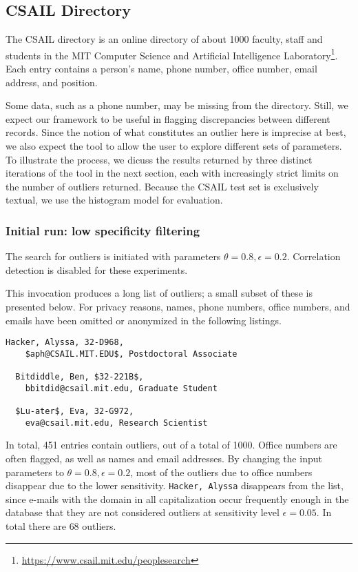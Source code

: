 \subsection{CSAIL Directory}
\label{sec:csail-directory-evaluation}

The CSAIL directory is an online directory of about 1000 faculty, staff and students in the MIT Computer Science and Artificial Intelligence Laboratory\footnote{\url{https://www.csail.mit.edu/peoplesearch}}. Each entry contains a person's name, phone number, office number, email address, and position.

Some data, such as a phone number, may be missing from the directory. Still, we expect our framework to be useful in flagging discrepancies between different records. Since the notion of what constitutes an outlier here is imprecise at best, we also expect the tool to allow the user to explore different sets of parameters. To illustrate the process, we dicuss the results returned by three distinct iterations of the tool in the next section, each with increasingly strict limits on the number of outliers returned. Because the CSAIL test set is exclusively textual, we use the histogram model for evaluation.

\subsubsection{Initial run: low specificity filtering}
The search for outliers is initiated with parameters $\theta = 0.8, \epsilon = 0.2$. Correlation detection is disabled for these experiments.

This invocation produces a long list of outliers; a small subset of these is presented below. For privacy reasons, names,  phone numbers, office numbers, and emails have been omitted or anonymized in the following listings.

\begin{lstlisting}[gobble=2]
  Hacker, Alyssa, 32-D968,
    $aph@CSAIL.MIT.EDU$, Postdoctoral Associate

  Bitdiddle, Ben, $32-221B$,
    bbitdid@csail.mit.edu, Graduate Student

  $Lu-ater$, Eva, 32-G972,
    eva@csail.mit.edu, Research Scientist
\end{lstlisting}

In total, 451 entries contain outliers, out of a total of 1000. Office numbers are often flagged, as well as names and email addresses. By changing the input parameters to $\theta = 0.8, \epsilon = 0.2$, most of the outliers due to office numbers disappear due to the lower sensitivity. \lstinline{Hacker, Alyssa} disappears from the list, since e-mails with the domain in all capitalization occur frequently enough in the database that they are not considered outliers at sensitivity level $\epsilon = 0.05$. In total there are $68$ outliers.


